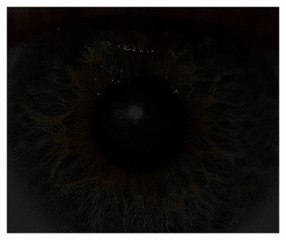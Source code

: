 \documentclass{article}
\begin{document}
\begin{figure}[H]
\begin{subfigure}{.09\textwidth}
  \label{fig:arrow}
\end{subfigure}%
\begin{subfigure}{.47\textwidth}
  \centering
  \includegraphics[width=0.97\linewidth]{_Figures/raw_data_3_highpass.png}
  \caption{}
  \label{fig:raw_3_highpass}
\end{subfigure}



\end{figure}
\end{document}
